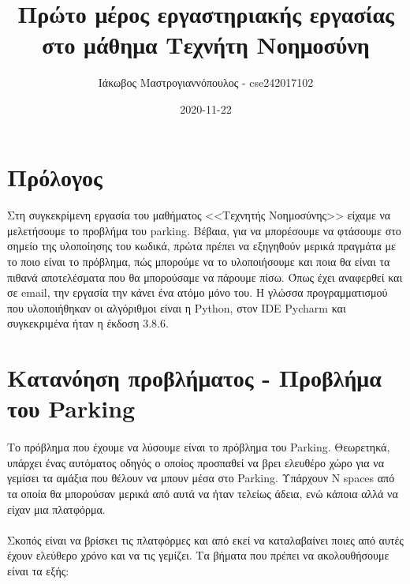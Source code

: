 \documentclass{article}
\title{Πρώτο μέρος εργαστηριακής εργασίας στο μάθημα Τεχνήτη Νοημοσύνη}
\date{2020-11-22}
\author{Ιάκωβος Μαστρογιαννόπουλος - cse242017102}
\begin{document}
    \maketitle
    
    \newpage
    \tableofcontents
    \newpage
    \lstlistoflistings

    \newpage
    \section{Πρόλογος}

    \paragraph{}
    Στη συγκεκρίμενη εργασία του μαθήματος <<Τεχνητής Νοημοσύνης>> είχαμε να μελετήσουμε το προβλήμα του parking. Βέβαια,
    για να μπορέσουμε να φτάσουμε στο σημείο της υλοποίησης του κωδικά, πρώτα πρέπει να εξηγηθούν μερικά πραγμάτα με το ποιο είναι
    το πρόβλημα, πώς μπορούμε να το υλοποιήσουμε και ποια θα είναι τα πιθανά αποτελέσματα που θα μπορούσαμε να πάρουμε πίσω.  
    Όπως έχει αναφερθεί και σε email, την εργασία την κάνει ένα ατόμο μόνο του. Η γλώσσα προγραμματισμού που υλοποιήθηκαν οι αλγόριθμοι
    είναι η Python, στον IDE Pycharm και συγκεκριμένα ήταν η έκδοση 3.8.6.

    \newpage
    \section{Κατανόηση προβλήματος - Προβλήμα του Parking}
    \paragraph{}
    Το πρόβλημα που έχουμε να λύσουμε είναι το πρόβλημα του Parking. Θεωρετηκά, υπάρχει ένας αυτόματος οδηγός ο οποίος προσπαθεί να βρει
    ελευθέρο χώρο για να γεμίσει τα αμάξια που θέλουν να μπουν μέσα στο Parking. Υπάρχουν Ν spaces από τα οποία θα μπορούσαν μερικά από αυτά
    να ήταν τελείως άδεια, ενώ κάποια αλλά να είχαν μια πλατφόρμα.

    \paragraph{}
    Σκοπός είναι να βρίσκει τις πλατφόρμες και από εκεί να καταλαβαίνει ποιες από αυτές έχουν ελεύθερο χρόνο και να τις γεμίζει. Τα βήματα που
    πρέπει να ακολουθήσουμε είναι τα εξής:
\end{document}
